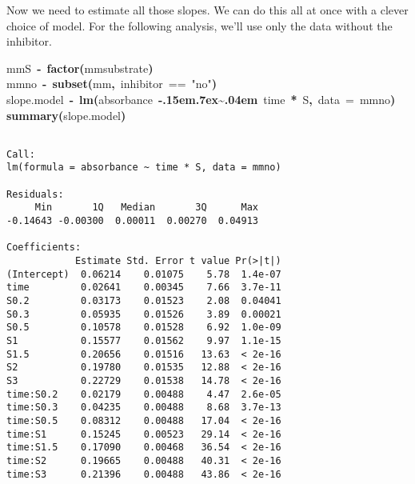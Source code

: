 \documentclass{article}\usepackage{graphicx, color}
\makeatletter
\newcommand{\hlfunctioncall}[1]{\textcolor[rgb]{0.501960784313725,0,0.329411764705882}{\textbf{#1}}}%
\newcommand{\hlstring}[1]{\textcolor[rgb]{0.6,0.6,1}{#1}}%
\newcommand{\hlkeyword}[1]{\textcolor[rgb]{0,0,0}{\textbf{#1}}}%
\newcommand{\hlargument}[1]{\textcolor[rgb]{0.690196078431373,0.250980392156863,0.0196078431372549}{#1}}%
\newcommand{\hlassignement}[1]{\textcolor[rgb]{0,0,0}{\textbf{#1}}}%
\newcommand{\hlsymbol}[1]{\textcolor[rgb]{0,0,0}{#1}}%
\def\urltilda{\kern -.15em\lower .7ex\hbox{\~{}}\kern .04em}%
\newcommand{\hlstd}[1]{\textcolor[rgb]{0,0,0}{#1}}%
\newenvironment{kframe}{%
 \def\FrameCommand##1{\hskip\@totalleftmargin \hskip-\fboxsep
 \colorbox{shadecolor}{##1}\hskip-\fboxsep
     \hskip-\linewidth \hskip-\@totalleftmargin \hskip\columnwidth}%
 \MakeFramed {\advance\hsize-\width
   \@totalleftmargin\z@ \linewidth\hsize
   \@setminipage}}%
 {\par\unskip\endMakeFramed}
\newenvironment{knitrout}{}{} %
\makeatother
\begin{document}
Now we need to estimate all those slopes.  We can do this all at once with a clever
choice of model.  For the following analysis, we'll use only the data without 
the inhibitor.
\begin{knitrout}
\color{fgcolor}\begin{kframe}
\begin{flushleft}
\ttfamily\noindent
\hlsymbol{mm}\hlkeyword{\usebox{\hlnormalsizeboxdollar}}\hlsymbol{S}{\ }\hlassignement{\usebox{\hlnormalsizeboxlessthan}-}{\ }\hlfunctioncall{factor}\hlkeyword{(}\hlsymbol{mm}\hlkeyword{\usebox{\hlnormalsizeboxdollar}}\hlsymbol{substrate}\hlkeyword{)}\hspace*{\fill}\\
\hlstd{}\hlsymbol{mmno}{\ }\hlassignement{\usebox{\hlnormalsizeboxlessthan}-}{\ }\hlfunctioncall{subset}\hlkeyword{(}\hlsymbol{mm}\hlkeyword{,}{\ }\hlsymbol{inhibitor}{\ }=={\ }\hlstring{"{}{}no"{}{}}\hlkeyword{)}\hspace*{\fill}\\
\hlstd{}\hlsymbol{slope.model}{\ }\hlassignement{\usebox{\hlnormalsizeboxlessthan}-}{\ }\hlfunctioncall{lm}\hlkeyword{(}\hlsymbol{absorbance}{\ }\hlkeyword{\urltilda{}}{\ }\hlsymbol{time}{\ }\hlkeyword{*}{\ }\hlsymbol{S}\hlkeyword{,}{\ }\hlargument{data}{\ }\hlargument{=}{\ }\hlsymbol{mmno}\hlkeyword{)}\hspace*{\fill}\\
\hlstd{}\hlfunctioncall{summary}\hlkeyword{(}\hlsymbol{slope.model}\hlkeyword{)}\mbox{}
\normalfont
\end{flushleft}
\begin{verbatim}

Call:
lm(formula = absorbance ~ time * S, data = mmno)

Residuals:
     Min       1Q   Median       3Q      Max 
-0.14643 -0.00300  0.00011  0.00270  0.04913 

Coefficients:
            Estimate Std. Error t value Pr(>|t|)
(Intercept)  0.06214    0.01075    5.78  1.4e-07
time         0.02641    0.00345    7.66  3.7e-11
S0.2         0.03173    0.01523    2.08  0.04041
S0.3         0.05935    0.01526    3.89  0.00021
S0.5         0.10578    0.01528    6.92  1.0e-09
S1           0.15577    0.01562    9.97  1.1e-15
S1.5         0.20656    0.01516   13.63  < 2e-16
S2           0.19780    0.01535   12.88  < 2e-16
S3           0.22729    0.01538   14.78  < 2e-16
time:S0.2    0.02179    0.00488    4.47  2.6e-05
time:S0.3    0.04235    0.00488    8.68  3.7e-13
time:S0.5    0.08312    0.00488   17.04  < 2e-16
time:S1      0.15245    0.00523   29.14  < 2e-16
time:S1.5    0.17090    0.00468   36.54  < 2e-16
time:S2      0.19665    0.00488   40.31  < 2e-16
time:S3      0.21396    0.00488   43.86  < 2e-16


\end{verbatim}
\end{kframe}
\end{knitrout}
\end{document}
